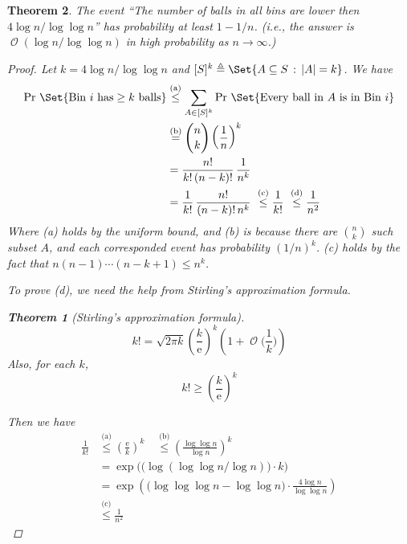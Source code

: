 \documentclass[12pt, a4paper]{article}
\DeclarePairedDelimiter{\abs}{\lvert}{\rvert}
\newcommand{\eu}{\mathrm{e}}
\newcommand{\ord}{\operatorname{\mathcal{O}}}
\newcommand{\defeq}{\triangleq}
\newtheorem{theorem}{Theorem}
\theoremstyle{mystyle} %
\begin{document}
\begin{theorem}
  The event ``The number of balls in all bins are lower then $4 \log n / \log \log n$''
  has probability at least $1 - 1/n$. (i.e., the answer is $\ord( \log n / \log \log n )$
  in high probability as $n \to \infty$.)

  \begin{proof}
    Let $k = 4 \log n / \log \log n$ and $[S]^k \defeq \Set{ A \subseteq S \,:\, \abs{A} = k }$.
    We have
    \begin{align*}
      \Pr\,\Set{ \text{Bin } i \text{ has} \geq k \text{ balls} }
      &\stackrel{\text{(a)}}{\leq} \sum_{A \in [S]^k} \Pr\,\Set{ \text{Every ball in } A \text{ is in Bin } i } \\
      &\stackrel{\text{(b)}}{=} {n \choose k} \left( \frac{1}{n} \right)^k \\
      &= \frac{n!}{k! \, (n-k)!} \, \frac{1}{n^k}  \\
      &= \frac{1}{k!} \, \frac{n!}{(n-k)! \, n^k}
      \ \stackrel{\text{(c)}}{\leq} \frac{1}{k!}
      \ \stackrel{\text{(d)}}{\leq} \frac{1}{n^2} \qedhere
    \end{align*}
    Where (a) holds by the uniform bound, and (b) is because there are ${n \choose k}$ such
    subset $A$, and each corresponded event has probability $(1/n)^k$. (c) holds by the fact
    that $n (n-1) \dotsm (n-k+1) \leq n^k$.

    To prove (d), we need the help from Stirling's approximation formula.
    \medskip

    \begin{theorem}[Stirling's approximation formula]
      \[ k! = \sqrt{2 \pi k} \left( \frac{k}{\eu} \right)^k \left( 1 + \ord\big( \frac{1}{k} \big) \right) \]
      Also, for each $k$,
      \[ k! \geq \left( \frac{k}{\eu} \right)^k \]
    \end{theorem}

    Then we have
    \begin{align*}
      \frac{1}{k!} &\stackrel{\text{(a)}}{\leq}
        \left( \frac{\eu}{k} \right)^k \quad
        \stackrel{\text{(b)}}{\leq} \left( \frac{ \log \log n }{ \log n} \right)^k \\
      &= \exp\big( \big( \log (\log \log n / \log n ) \big) \cdot k \big) \\
      &= \exp\left( \big( \log \log \log n - \log \log n \big) \cdot \frac{4 \log n}{\log \log n} \right) \\
      &\stackrel{\text{(c)}}{\leq} \frac{1}{n^2}
    \end{align*}
  \end{proof}
\end{theorem}
\end{document}
